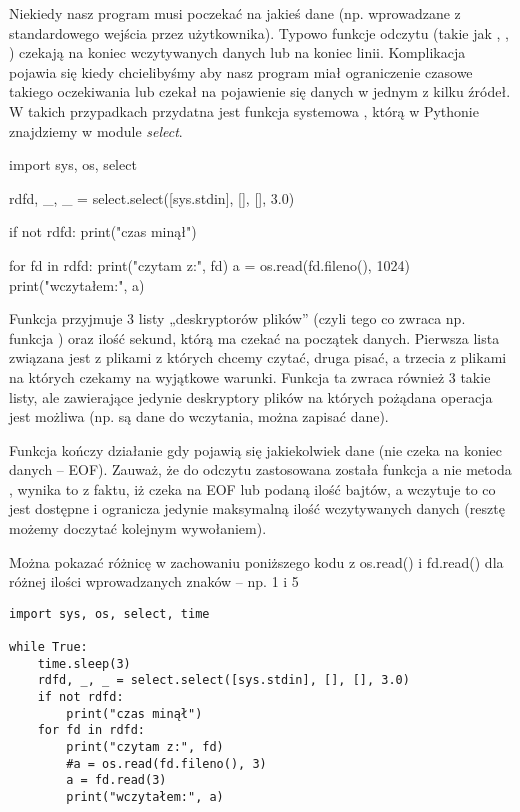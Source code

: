 Niekiedy nasz program musi poczekać na jakieś dane (np. wprowadzane z standardowego wejścia przez użytkownika).
Typowo funkcje odczytu (takie jak , , ) czekają na koniec wczytywanych danych lub na koniec linii.
Komplikacja pojawia się kiedy chcielibyśmy aby nasz program miał ograniczenie czasowe takiego oczekiwania lub czekał na pojawienie się danych w jednym z kilku źródeł.
W takich przypadkach przydatna jest funkcja systemowa , którą w Pythonie znajdziemy w module \textit{select}.

\begin{CodeFrame*}[python]{}
import sys, os, select

rdfd, _, _ = select.select([sys.stdin], [], [], 3.0)

if not rdfd:
	print("czas minął")

for fd in rdfd:
	print("czytam z:", fd)
	a = os.read(fd.fileno(), 1024)
	print("wczytałem:", a)
\end{CodeFrame*}

Funkcja  przyjmuje 3 listy „deskryptorów plików” (czyli tego co zwraca np. funkcja ) oraz ilość sekund, którą ma czekać na początek danych. Pierwsza lista związana jest z plikami z których chcemy czytać, druga pisać, a trzecia z plikami na których czekamy na wyjątkowe warunki. Funkcja ta zwraca również 3 takie listy, ale zawierające jedynie deskryptory plików na których pożądana operacja jest możliwa (np. są dane do wczytania, można zapisać dane).

Funkcja  kończy działanie gdy pojawią się jakiekolwiek dane (nie czeka na koniec danych – EOF). Zauważ, że do odczytu zastosowana została funkcja  a nie metoda , wynika to z faktu, iż  czeka na EOF lub podaną ilość bajtów, a  wczytuje to co jest dostępne i ogranicza jedynie maksymalną ilość wczytywanych danych (resztę możemy doczytać kolejnym wywołaniem).

\begin{teacherOnly}
Można pokazać różnicę w zachowaniu poniższego kodu z os.read() i fd.read() dla różnej ilości wprowadzanych znaków – np. 1 i 5
\begin{Verbatim}
import sys, os, select, time

while True:
	time.sleep(3)
	rdfd, _, _ = select.select([sys.stdin], [], [], 3.0)
	if not rdfd:
		print("czas minął")
	for fd in rdfd:
		print("czytam z:", fd)
		#a = os.read(fd.fileno(), 3)
		a = fd.read(3)
		print("wczytałem:", a)
\end{Verbatim}
\end{teacherOnly}
